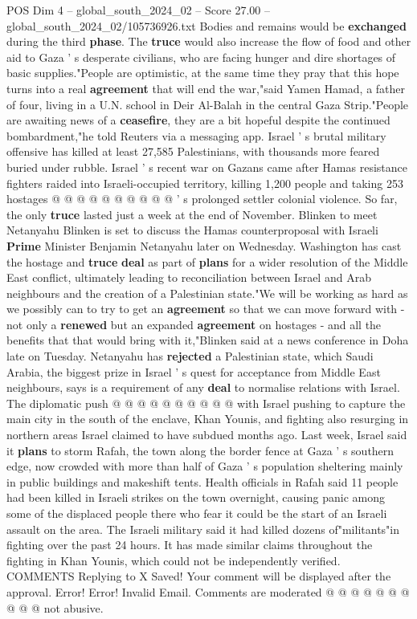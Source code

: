 \begin{textsample}{POS Dim 4 – global\_south\_2024\_02 – Score 27.00 – global\_south\_2024\_02/105736926.txt}
Bodies and remains would be \textbf{exchanged} during the third \textbf{phase}.
The \textbf{truce} would also increase the flow of food and other aid to Gaza ' s desperate civilians, who are facing hunger and dire shortages of basic supplies."People are optimistic, at the same time they pray that this hope turns into a real \textbf{agreement} that will end the war,"said Yamen Hamad, a father of four, living in a U.N. school in Deir Al-Balah in the central Gaza Strip."People are awaiting news of a \textbf{ceasefire}, they are a bit hopeful despite the continued bombardment,"he told Reuters via a messaging app.
Israel ' s brutal military offensive has killed at least 27,585 Palestinians, with thousands more feared buried under rubble.
Israel ' s recent war on Gazans came after Hamas resistance fighters raided into Israeli-occupied territory, killing 1,200 people and taking 253 hostages @ @ @ @ @ @ @ @ @ @ ' s prolonged settler colonial violence.
So far, the only \textbf{truce} lasted just a week at the end of November.
Blinken to meet Netanyahu Blinken is set to discuss the Hamas counterproposal with Israeli \textbf{Prime} Minister Benjamin Netanyahu later on Wednesday.
Washington has cast the hostage and \textbf{truce} \textbf{deal} as part of \textbf{plans} for a wider resolution of the Middle East conflict, ultimately leading to reconciliation between Israel and Arab neighbours and the creation of a Palestinian state."We will be working as hard as we possibly can to try to get an \textbf{agreement} so that we can move forward with - not only a \textbf{renewed} but an expanded \textbf{agreement} on hostages - and all the benefits that that would bring with it,"Blinken said at a news conference in Doha late on Tuesday.
Netanyahu has \textbf{rejected} a Palestinian state, which Saudi Arabia, the biggest prize in Israel ' s quest for acceptance from Middle East neighbours, says is a requirement of any \textbf{deal} to normalise relations with Israel.
The diplomatic push @ @ @ @ @ @ @ @ @ @ with Israel pushing to capture the main city in the south of the enclave, Khan Younis, and fighting also resurging in northern areas Israel claimed to have subdued months ago.
Last week, Israel said it \textbf{plans} to storm Rafah, the town along the border fence at Gaza ' s southern edge, now crowded with more than half of Gaza ' s population sheltering mainly in public buildings and makeshift tents.
Health officials in Rafah said 11 people had been killed in Israeli strikes on the town overnight, causing panic among some of the displaced people there who fear it could be the start of an Israeli assault on the area.
The Israeli military said it had killed dozens of"militants"in fighting over the past 24 hours.
It has made similar claims throughout the fighting in Khan Younis, which could not be independently verified.
COMMENTS Replying to X Saved!
Your comment will be displayed after the approval.
Error!
Error!
Invalid Email.
Comments are moderated @ @ @ @ @ @ @ @ @ @ not abusive.


\end{textsample}
